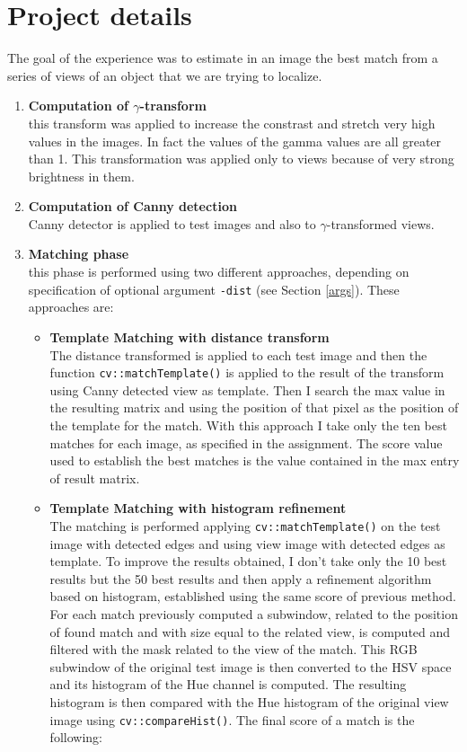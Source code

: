 \documentclass{article}
\begin{document}
\section{Project details}
The goal of the experience was to estimate in an image the best match from a series of views of an object that we are trying to localize. 
\begin{enumerate}
\item{\textbf{Computation of $\gamma$-transform}\\
this transform was applied to increase the constrast and stretch very high values in the images. In fact the values of the gamma values are all greater than 1. This transformation was applied only to views because of very strong brightness in them.}
\item{\textbf{Computation of Canny detection}\\
Canny detector is applied to test images and also to $\gamma$-transformed views.}
\item{\textbf{Matching phase}\\
this phase is performed using two different approaches, depending on specification of optional argument \texttt{-dist} (see Section \ref{args}). These approaches are:
\begin{itemize}
\item{\textbf{Template Matching with distance transform}\\
The distance transformed is applied to each test image and then the function \texttt{cv::matchTemplate()} is applied to the result of the transform using Canny detected view as template. Then I search the max value in the resulting matrix and using the position of that pixel as the position of the template for the match. With this approach I take only the ten best matches for each image, as specified in the assignment. The score value used to establish the best matches is the value contained in the max entry of result matrix.
}
\item{\textbf{Template Matching with histogram refinement}\\
The matching is performed applying \texttt{cv::matchTemplate()} on the test image with detected edges and using view image with detected edges as template. To improve the results obtained, I don't take only the 10 best results but the 50 best results and then apply a refinement algorithm based on histogram, established using the same score of previous method. For each match previously computed a subwindow, related to the position of found match and with size equal to the related view, is computed and filtered with the mask related to the view of the match. This RGB subwindow of the original test image is then converted to the HSV space and its histogram of the Hue channel is computed. The resulting histogram is then compared with the Hue histogram of the original view image using \texttt{cv::compareHist()}. The final score of a match is the following:
}
\end{itemize}}
\end{enumerate}
\end{document}
